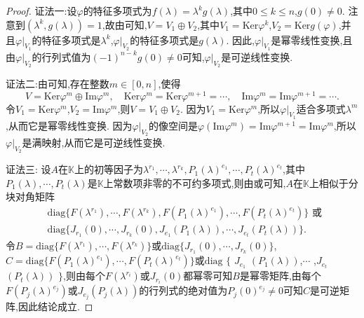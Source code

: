\documentclass[../../main.tex]{subfiles}%
\begin{document}
\begin{proof}

{\color{blue}证法一:}设$\varphi$的特征多项式为$f(\lambda)=\lambda^kg(\lambda)$,其中$0\leqslant k\leqslant n$,$g(0)\neq 0$. 注意到$(\lambda^k,g(\lambda)) = 1$,故由可知,$V = V_1\oplus V_2$,其中$V_1=\mathrm{Ker}\varphi^k$,$V_2=\mathrm{Ker}g(\varphi)$,并且$\varphi|_{V_1}$的特征多项式是$\lambda^k$,$\varphi|_{V_2}$的特征多项式是$g(\lambda)$. 因此,$\varphi|_{V_1}$是幂零线性变换,且由$\varphi|_{V_2}$的行列式值为$(-1)^{n - k}g(0)\neq 0$可知,$\varphi|_{V_2}$是可逆线性变换.

{\color{blue}证法二:}由可知,存在整数$m\in[0,n]$,使得
\[V=\mathrm{Ker}\varphi^m\oplus\mathrm{Im}\varphi^m,\quad \mathrm{Ker}\varphi^m=\mathrm{Ker}\varphi^{m + 1}=\cdots,\quad \mathrm{Im}\varphi^m=\mathrm{Im}\varphi^{m + 1}=\cdots.\]
令$V_1=\mathrm{Ker}\varphi^m$,$V_2=\mathrm{Im}\varphi^m$,则$V = V_1\oplus V_2$. 因为$V_1=\mathrm{Ker}\varphi^m$,所以$\varphi|_{V_1}$适合多项式$\lambda^m$,从而它是幂零线性变换. 因为$\varphi|_{V_2}$的像空间是$\varphi(\mathrm{Im}\varphi^m)=\mathrm{Im}\varphi^{m + 1}=\mathrm{Im}\varphi^m$,所以$\varphi|_{V_2}$是满映射,从而它是可逆线性变换. 

{\color{blue}证法三:}
设$A$在$\mathbb{K}$上的初等因子为$\lambda^{r_1},\cdots,\lambda^{r_k},P_1(\lambda)^{e_1},\cdots,P_t(\lambda)^{e_t}$,其中$P_1(\lambda),\cdots,P_t(\lambda)$是$\mathbb{K}$上常数项非零的不可约多项式,则由或可知,$A$在$\mathbb{K}$上相似于分块对角矩阵
\begin{align*}
&\mathrm{diag}\{F(\lambda^{r_1}),\cdots,F(\lambda^{r_k}),F(P_1(\lambda)^{e_1}),\cdots,F(P_t(\lambda)^{e_t})\}\text{ 或 }\\
&\mathrm{diag}\{J_{r_1}(0),\cdots,J_{r_k}(0),J_{e_1}(P_1(\lambda)),\cdots,J_{e_t}(P_t(\lambda))\}.
\end{align*}
令$B = \mathrm{diag}\{F(\lambda^{r_1}),\cdots,F(\lambda^{r_k})\}$或$\mathrm{diag}\{J_{r_1}(0),\cdots,J_{r_k}(0)\}$,$C = \mathrm{diag}\{F(P_1(\lambda)^{e_1}),\cdots,F(P_t(\lambda)^{e_t})\}$或$\mathrm{diag}$ $\{$ $J_{e_1}$ $(P_1(\lambda))$,$\cdots$ ,$J_{e_t}$ $(P_t(\lambda))$ $\}$,则由每个$F(\lambda^{r_i})$或$J_{r_i}(0)$都幂零可知$B$是幂零矩阵,由每个$F(P_j(\lambda)^{e_j})$或$J_{e_j}(P_j(\lambda))$的行列式的绝对值为$P_j(0)^{e_j}\neq 0$可知$C$是可逆矩阵,因此结论成立.

\end{proof}
\end{document}
